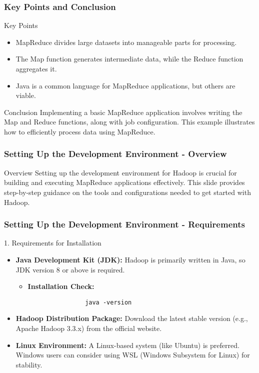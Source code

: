 \documentclass[aspectratio=169]{beamer}
\begin{document}
\begin{frame}
    \frametitle{Key Points and Conclusion}
    \begin{block}{Key Points}
        \begin{itemize}
            \item MapReduce divides large datasets into manageable parts for processing.
            \item The Map function generates intermediate data, while the Reduce function aggregates it.
            \item Java is a common language for MapReduce applications, but others are viable.
        \end{itemize}
    \end{block}
    
    \begin{block}{Conclusion}
        Implementing a basic MapReduce application involves writing the Map and Reduce functions, along with job configuration. This example illustrates how to efficiently process data using MapReduce.
    \end{block}
\end{frame}

\begin{frame}[fragile]
    \frametitle{Setting Up the Development Environment - Overview}
    \begin{block}{Overview}
        Setting up the development environment for Hadoop is crucial for building and executing MapReduce applications effectively. This slide provides step-by-step guidance on the tools and configurations needed to get started with Hadoop.
    \end{block}
\end{frame}

\begin{frame}[fragile]
    \frametitle{Setting Up the Development Environment - Requirements}
    \begin{block}{1. Requirements for Installation}
        \begin{itemize}
            \item \textbf{Java Development Kit (JDK):} Hadoop is primarily written in Java, so JDK version 8 or above is required.
            \begin{itemize}
                \item \textbf{Installation Check:} 
                \begin{lstlisting}
                java -version
                \end{lstlisting}
            \end{itemize}
            \item \textbf{Hadoop Distribution Package:} Download the latest stable version (e.g., Apache Hadoop 3.3.x) from the official website.
            \item \textbf{Linux Environment:} A Linux-based system (like Ubuntu) is preferred. Windows users can consider using WSL (Windows Subsystem for Linux) for stability.
        \end{itemize}
    \end{block}
\end{frame}
\end{document}
